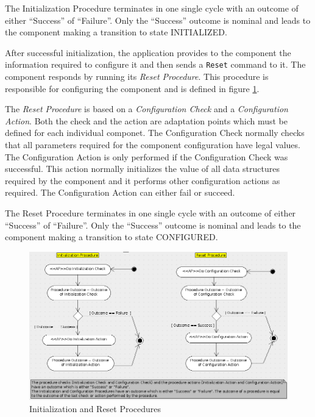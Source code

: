 \documentclass[a4paper,10pt]{article}
\begin{document}
The Initialization Procedure terminates in one single cycle with an outcome of either “Success” of “Failure”. 
Only the “Success” outcome is nominal and leads to the component making a transition to state INITIALIZED.

After successful initialization, the application provides to the component the information required to configure it and then sends a \texttt{Reset} command to it. 
The component responds by running its \textit{Reset Procedure}. 
This procedure is responsible for configuring the component and is defined in figure  \ref{fig:InitializationAndReset}.
 
The \textit{Reset Procedure} is based on a \textit{Configuration Check} and a \textit{Configuration Action}. 
Both the check and the action are adaptation points which must be defined for each individual componet. 
The Configuration Check normally checks that all parameters required for the component configuration have legal values. 
The Configuration Action is only performed if the Configuration Check was successful. 
This action normally initializes the value of all data structures required by the component and it performs other configuration actions as required. 
The Configuration Action can either fail or succeed.

The Reset Procedure terminates in one single cycle with an outcome of either “Success” of “Failure”. 
Only the “Success” outcome is nominal and leads to the component making a transition to state CONFIGURED.

\begin{figure}[ht]
 \centering
 \includegraphics[scale=0.3,keepaspectratio=true]{InitializationAndReset.png}
 \caption{Initialization and Reset Procedures}
 \label{fig:InitializationAndReset}
\end{figure}
\end{document}
